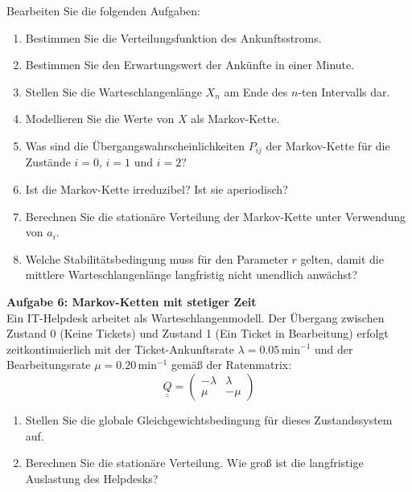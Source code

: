 \documentclass[11pt,a4paper]{article}
\begin{document}
Bearbeiten Sie die folgenden Aufgaben:
\begin{enumerate}
    \item[a)] Bestimmen Sie die Verteilungsfunktion des Ankunftsstroms.
    \item[b)] Bestimmen Sie den Erwartungswert der Ankünfte in einer Minute.
    \item[c)] Stellen Sie die Warteschlangenlänge $X_n$ am Ende des $n$-ten Intervalls dar.
    \item[d)] Modellieren Sie die Werte von $X$ als Markov-Kette.
    \item[e)] Was sind die Übergangswahrscheinlichkeiten $P_{ij}$ der Markov-Kette für die Zustände $i=0$, $i=1$ und $i=2$?
    \item[f)] Ist die Markov-Kette irreduzibel? Ist sie aperiodisch?
    \item[g)] Berechnen Sie die stationäre Verteilung der Markov-Kette unter Verwendung von $a_i$.
    \item[h)] Welche Stabilitätsbedingung muss für den Parameter $r$ gelten, damit die mittlere Warteschlangenlänge langfristig nicht unendlich anwächst?
\end{enumerate}

\vspace{0.5cm}

\textbf{Aufgabe 6: Markov-Ketten mit stetiger Zeit} \\
Ein IT-Helpdesk arbeitet als Warteschlangenmodell. Der Übergang zwischen Zustand 0 (Keine Tickets) und Zustand 1 (Ein Ticket in Bearbeitung) erfolgt zeitkontinuierlich mit der Ticket-Ankunftsrate $\lambda = 0.05 \, \text{min}^{-1}$ und der Bearbeitungsrate $\mu = 0.20 \, \text{min}^{-1}$ gemäß der Ratenmatrix:
\[
\underline{\underline{Q}} = \begin{pmatrix} -\lambda & \lambda \\ \mu & -\mu \end{pmatrix}
\]
\begin{enumerate}
    \item[a)] Stellen Sie die globale Gleichgewichtsbedingung für dieses Zustandssystem auf.
    \item[b)] Berechnen Sie die stationäre Verteilung. Wie groß ist die langfristige Auslastung des Helpdesks?
\end{enumerate}

\newpage

\end{document}
